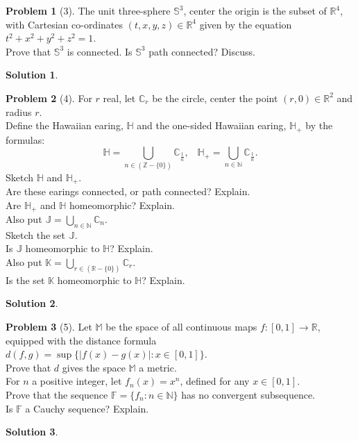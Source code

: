 \documentclass{article}
\theoremstyle{definition}
\newtheorem*{soln}{Solution}
\newtheorem*{prob}{Problem}
\theoremstyle{theorem}
\begin{document}
\begin{prob}[3]
The unit three-sphere $\mathbb{S}^3$, center the origin is the subset of $\mathbb{R}^4$, with Cartesian co-ordinates $(t, x, y, z) \in \mathbb{R}^4$ given by the equation $t^2 + x^2 + y^2 + z^2 = 1$.  \\Prove that $\mathbb{S}^3$ is connected.  Is $\mathbb{S}^3$ path connected?  Discuss.
\end{prob}
\begin{soln}

\end{soln}
\vspace{1in}




\begin{prob}[4]
For $r$ real, let $\mathbb{C}_r$ be the circle, center the point  $(r, 0) \in \mathbb{R}^2$ and radius $r$. \\ Define the Hawaiian earing, $\mathbb{H}$ and the one-sided Hawaiian earing, $\mathbb{H}_+$ by the formulas:
\[ \mathbb{H} =   \bigcup_{n \in (\mathbb{Z} - \{0\})} \mathbb{C}_{\frac{1}{n}}, \hspace{10pt} \mathbb{H}_+ =   \bigcup_{n \in \mathbb{N}} \mathbb{C}_{\frac{1}{n}}. \] 
Sketch $\mathbb{H}$ and $\mathbb{H}_+$.\\
Are these earings connected, or path connected? Explain. \\
Are $\mathbb{H}_+$ and $\mathbb{H}$ homeomorphic? Explain.\\
Also put $\mathbb{J} =  \bigcup_{n \in \mathbb{N}} \mathbb{C}_{n}$.\\
Sketch the set $\mathbb{J}$.\\
Is $\mathbb{J}$ homeomorphic to $\mathbb{H}$? Explain.\\
Also put $\mathbb{K} =  \bigcup_{r \in (\mathbb{R} - \{0\})} \mathbb{C}_{r}$.\\
Is the set $\mathbb{K}$ homeomorphic to $\mathbb{H}$? Explain.


\end{prob}
\begin{soln}

\end{soln}
\vspace{1in}


\begin{prob}[5]
Let $\mathbb{M}$ be the space of all continuous maps $f:[0, 1] \rightarrow \mathbb{R}$, equipped with the distance formula $d(f,g ) =  \sup\{ |f(x) - g(x)|:  x \in [0, 1]\}$.  \\Prove that $d$ gives the space $\mathbb{M}$ a metric.   \\For $n$ a positive integer, let $f_n(x) = x^n$, defined for any $x\in [0, 1]$. \\ Prove that the sequence $\mathbb{F} = \{f_n: n \in \mathbb{N}\}$ has no convergent subsequence. \\ Is $\mathbb{F}$ a Cauchy sequence? Explain. 
\end{prob}
\begin{soln}

\end{soln}
\vspace{1in}
\end{document}
